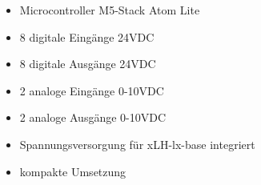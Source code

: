 
\begin{itemize}
    \item Microcontroller M5-Stack Atom Lite
    \item 8 digitale Eingänge 24VDC
    \item 8 digitale Ausgänge 24VDC
    \item 2 analoge Eingänge 0-10VDC
    \item 2 analoge Ausgänge 0-10VDC
    \item Spannungsversorgung für xLH-lx-base integriert
    \item kompakte Umsetzung
\end{itemize}
